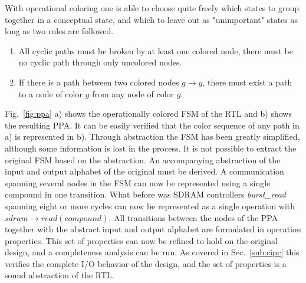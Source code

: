 With operational coloring one is able to choose quite freely which states to group together in a conceptual state, and which to leave out as "unimportant" states as long as two rules are followed. 
\begin{enumerate}
 \item All cyclic paths must be broken by at least one colored node, there must be no cyclic path through only uncolored nodes. 
 \item If there is a path between two colored nodes $g\rightarrow y$, there must exist a path to a node of color $y$ from any node of color $g$. 
\end{enumerate} 

Fig.~\ref{fig:ppa} a) shows the operationally colored FSM of the RTL and b) shows the resulting PPA. It can be easily verified that the color sequence of any path in a) is represented in b). Through abstraction the FSM has been greatly simplified, although some information is lost in the process. It is not possible to extract the original FSM based on the abstraction. An accompanying abstraction of the input and output alphabet of the original must be derived. A communication spanning several nodes in the FSM can now be represented using a single compound in one transition. What before was SDRAM controllers \textit{burst\_read} spanning eight or more cycles can now be represented as a single operation with $sdram\rightarrow read(compound)$. All transitions between the nodes of the PPA together with the abstract input and output alphabet are formulated in operation properties. This set of properties can now be refined to hold on the original design, and a completeness analysis can be run. As covered in Sec.~\ref{sub:cipc} this verifies the complete I/O behavior of the design, and the set of properties is a sound abstraction of the RTL.  



